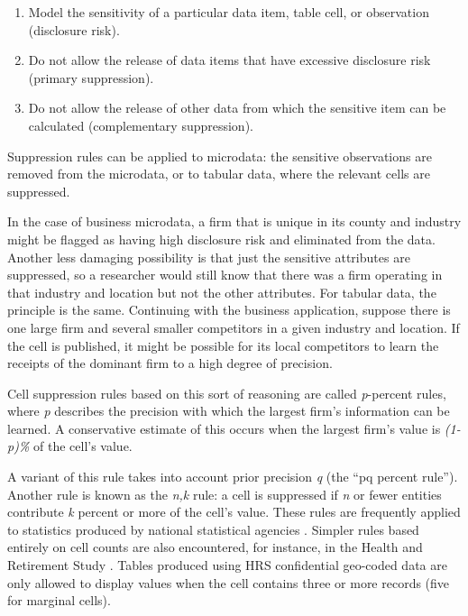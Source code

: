 \begin{enumerate}
\def\labelenumi{\arabic{enumi}.}
\tightlist
\item
  Model the sensitivity of a particular data item, table cell, or observation (disclosure risk).
\item
  Do not allow the release of data items that have excessive disclosure risk (primary suppression).
\item
  Do not allow the release of other data from which the sensitive item can be calculated (complementary suppression).
\end{enumerate}

Suppression rules can be applied to microdata: the sensitive observations are removed from the microdata, or to tabular data, where the relevant cells are suppressed.

In the case of business microdata, a firm that is unique in its county and industry might be flagged as having high disclosure risk and eliminated from the data. Another less damaging possibility is that just the sensitive attributes are suppressed, so a researcher would still know that there was a firm operating in that industry and location but not the other attributes. For tabular data, the principle is the same. Continuing with the business application, suppose there is one large firm and several smaller competitors in a given industry and location. If the cell is published, it might be possible for its local competitors to learn the receipts of the dominant firm to a high degree of precision.

Cell suppression rules based on this sort of reasoning are called \emph{p}-percent rules, where \emph{p} describes the precision with which the largest firm's information can be learned. A conservative estimate of this occurs when the largest firm's value is \emph{(1-p)\%} of the cell's value.

A variant of this rule takes into account prior precision \emph{q} (the ``pq percent rule''). Another rule is known as the \emph{n,k} rule: a cell is suppressed if \emph{n} or fewer entities contribute \emph{k} percent or more of the cell's value. These rules are frequently applied to statistics produced by national statistical agencies \citep{harris-kojetin_statistical_2005}. Simpler rules based entirely on cell counts are also encountered, for instance, in the Health and Retirement Study \citep{health_and_retirement_study_disclosure_nodate}. Tables produced using HRS confidential geo-coded data are only allowed to display values when the cell contains three or more records (five for marginal cells).

